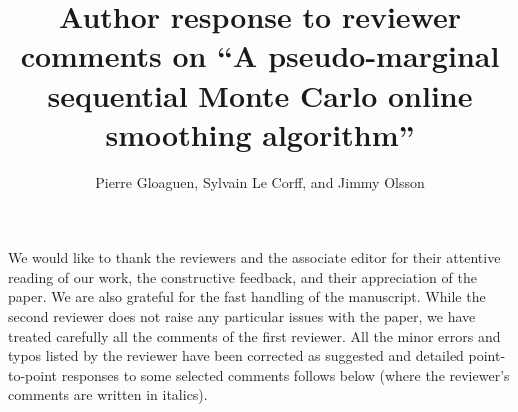 \documentclass[11pt]{amsart}
\title[Author response on ``A pseudo-marginal \ldots'']{Author response to reviewer comments on ``A pseudo-marginal sequential Monte Carlo online smoothing algorithm''}
\author{Pierre Gloaguen, Sylvain Le Corff, and Jimmy Olsson}
\begin{document}
\maketitle

We would like to thank the reviewers and the associate editor for their attentive reading of our work, the constructive feedback, and their appreciation of the paper. We are also grateful for the fast handling of the manuscript. While the second reviewer does not raise any particular issues with the paper, we have treated carefully all the comments of the first reviewer. All the minor errors and typos listed by the reviewer have been corrected as suggested and detailed point-to-point responses to some selected comments follows below (where the reviewer's comments are written in italics).
\end{document}
